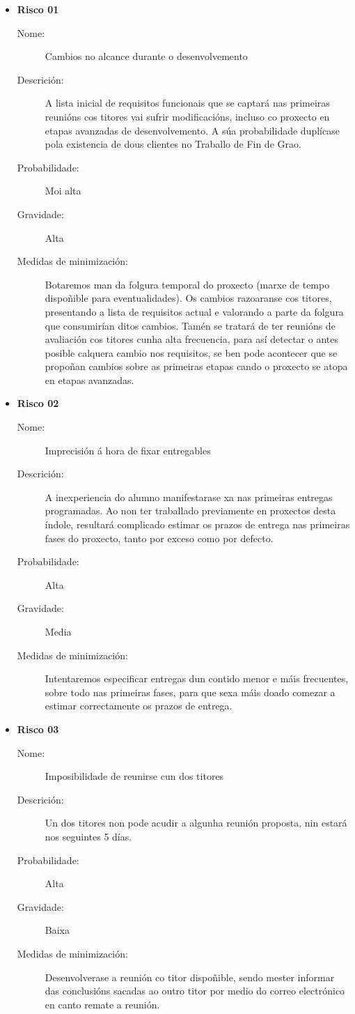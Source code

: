 \begin{itemize}

\item \textbf{Risco 01}
\begin{description}
\item[Nome:] Cambios no alcance durante o desenvolvemento
\item[Descrición:] A lista inicial de requisitos funcionais que se captará nas primeiras reunións cos titores vai sufrir modificacións, incluso co proxecto en etapas avanzadas de desenvolvemento. A súa probabilidade duplícase pola existencia de dous clientes no Traballo de Fin de Grao.
\item[Probabilidade:] Moi alta
\item[Gravidade:] Alta
\item[Medidas de minimización:] Botaremos man da folgura temporal do proxecto (marxe de tempo dispoñible para eventualidades). Os cambios razoaranse cos titores, presentando a lista de requisitos actual e valorando a parte da folgura que consumirían ditos cambios. Tamén se tratará de ter reunións de avaliación cos titores cunha alta frecuencia, para así detectar o antes posible calquera cambio nos requisitos, se ben pode acontecer que se propoñan cambios sobre as primeiras etapas cando o proxecto se atopa en etapas avanzadas.
\end{description}

\item \textbf{Risco 02}
\begin{description}
\item[Nome:] Imprecisión á hora de fixar entregables
\item[Descrición:] A inexperiencia do alumno manifestarase xa nas primeiras entregas programadas. Ao non ter traballado previamente en proxectos desta índole, resultará complicado estimar os prazos de entrega nas primeiras fases do proxecto, tanto por exceso como por defecto.
\item[Probabilidade:] Alta
\item[Gravidade:] Media
\item[Medidas de minimización:] Intentaremos especificar entregas dun contido menor e máis frecuentes, sobre todo nas primeiras fases, para que sexa máis doado comezar a estimar correctamente os prazos de entrega.
\end{description}

\item \textbf{Risco 03}
\begin{description}
\item[Nome:] Imposibilidade de reunirse cun dos titores
\item[Descrición:] Un dos titores non pode acudir a algunha reunión proposta, nin estará nos seguintes 5 días.
\item[Probabilidade:] Alta
\item[Gravidade:] Baixa
\item[Medidas de minimización:] Desenvolverase a reunión co titor dispoñible, sendo mester informar das conclusións sacadas ao outro titor por medio do correo electrónico en canto remate a reunión.
\end{description}


\end{itemize}
